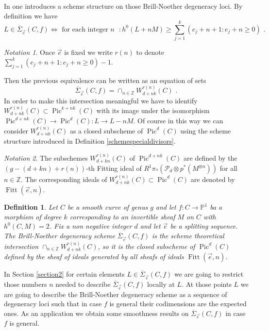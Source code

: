 \documentclass{article}
\DeclareMathOperator{\Pic}{Pic}
\DeclareMathOperator{\Fitt}{Fitt}
\newtheorem{definition}{Definition}
\theoremstyle{definition}
\theoremstyle{remark}
\newtheorem{notation}{Notation}
\begin{document}
In \cite {ref6} one introduces a scheme structure on those Brill-Noether degeneracy loci.
By definition we have
\[
L\in \overline{\Sigma}_{\overrightarrow {e}}(C,f) \Leftrightarrow \text { for each integer $n$ }: h^0(L+nM)\geq \sum_{j=1}^k(e_j+n+1 : e_j+n \geq 0) \text { .}
\]
\begin{notation}\label{notrn}
Once $\overrightarrow {e}$ is fixed we write $r(n)$ to denote $\sum_{j=1}^k (e_j+n+1 : e_j+n \geq 0)-1$.
\end{notation}
Then the previous equivalence can be written as an equation of sets
\[
\overline {\Sigma}_{\overrightarrow{e}}(C,f)=\cap_{n \in \mathbb{Z}}W^{r(n)}_{d+nk}(C) \text { .}
\]
In order to make this intersection meaningful we have to identify $W^{r(n)}_{d+nk}(C) \subset \Pic^{k+nk}(C)$ with its image under the isomorphism $\Pic ^{d+nk}(C) \rightarrow \Pic^d(C):L \rightarrow L-nM$.
Of course in this way we can consider $W^{r(n)}_{d+nk}(C)$ as a closed subscheme of $\Pic^d(C)$ using the scheme structure introduced in Definition \ref{schemespecialdivisors}.

\begin{notation}\label{notFitt}
The subschemes $W^{r(n)}_{d+kn}(C)$ of $\Pic ^{d+nk}(C)$ are defined by the $(g-(d+kn)+r(n))$-th Fitting ideal of $R^1\pi_*(\mathcal{P}_d \otimes p^*(M^{\otimes n}))$ for all $n \in \mathbb{Z}$.
The corresponding ideals of $W^{r(n)}_{d+nk}(C) \subset \Pic^d(C)$ are denoted by $\Fitt (\overrightarrow {e},n)$.
\end{notation}

\begin{definition}\label{schemedegloci}
Let $C$ be a smooth curve of genus $g$ and let $f: C \rightarrow \mathbb{P}^1$ ba a morphism of degree $k$ corresponding to an invertible sheaf $M$ on $C$ with $h^0(C,M)=2$.
Fix a non negative integer $d$ and let $\overrightarrow {e}$ be a splitting sequence.
The Brill-Noether degeneracy scheme $\overline{\Sigma}_{\overrightarrow {e}}(C,f)$ is the scheme theoretical intersection $\cap_{n \in \mathbb{Z}}W^{r(n)}_{d+nk}(C)$, so it is the closed subscheme of $\Pic^d(C)$ defined by the sheaf of ideals generated by all sheafs of ideals $\Fitt (\overrightarrow{e},n)$.
\end{definition}

In Section \ref{section2} for certain elements $L \in \overline {\Sigma}_{\overrightarrow {e}}(C,f)$ we are going to restrict those numbers $n$ needed to describe $\overline{\Sigma}_{\overrightarrow {e}}(C,f)$ locally at $L$. At those points $L$ we are going to describe the Brill-Noether degeneracy scheme as a sequence of degeneracy loci such that in case $f$ is general their codimensions are the expected ones.  As an application we obtain some smoothness results on $\overline{\Sigma}_{\overrightarrow {e}}(C,f)$ in case $f$ is general.
\end{document}
